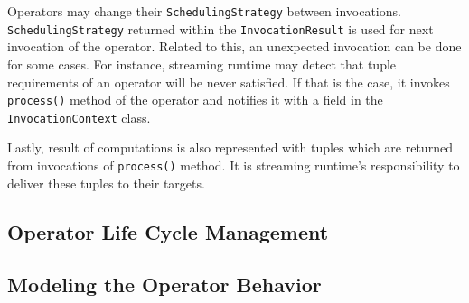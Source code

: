 Operators may change their \texttt{SchedulingStrategy} between invocations. \texttt{SchedulingStrategy} returned within the \texttt{InvocationResult} is used for next invocation of the operator. Related to this, an unexpected invocation can be done for some cases. For instance, streaming runtime may detect that tuple requirements of an operator will be never satisfied. If that is the case, it invokes \texttt{process()} method of the operator and notifies it with a field in the \texttt{InvocationContext} class.

Lastly, result of computations is also represented with tuples which are returned from invocations of \texttt{process()} method. It is streaming runtime's responsibility to deliver these tuples to their targets.

\subsection{Operator Life Cycle Management}\label{sec:operator-lifecycle}


\subsection{Modeling the Operator Behavior}\label{sec:operator-behavior}